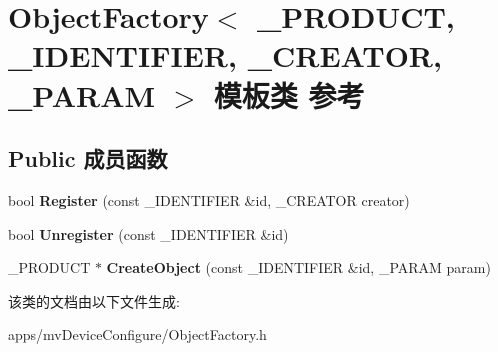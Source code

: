 \hypertarget{class_object_factory}{\section{Object\+Factory$<$ \+\_\+\+P\+R\+O\+D\+U\+C\+T, \+\_\+\+I\+D\+E\+N\+T\+I\+F\+I\+E\+R, \+\_\+\+C\+R\+E\+A\+T\+O\+R, \+\_\+\+P\+A\+R\+A\+M $>$ 模板类 参考}
\label{class_object_factory}
}
\subsection*{Public 成员函数}
\begin{DoxyCompactItemize}
\item 
\hypertarget{class_object_factory_af7f300f315c93d8d1061777167a89757}{bool {\bfseries Register} (const \+\_\+\+I\+D\+E\+N\+T\+I\+F\+I\+E\+R \&id, \+\_\+\+C\+R\+E\+A\+T\+O\+R creator)}\label{class_object_factory_af7f300f315c93d8d1061777167a89757}

\item 
\hypertarget{class_object_factory_a3758be797c33984e5d66e8d1408942cd}{bool {\bfseries Unregister} (const \+\_\+\+I\+D\+E\+N\+T\+I\+F\+I\+E\+R \&id)}\label{class_object_factory_a3758be797c33984e5d66e8d1408942cd}

\item 
\hypertarget{class_object_factory_a2800af9c7f02f2b63e8c8ce7354bf969}{\+\_\+\+P\+R\+O\+D\+U\+C\+T $\ast$ {\bfseries Create\+Object} (const \+\_\+\+I\+D\+E\+N\+T\+I\+F\+I\+E\+R \&id, \+\_\+\+P\+A\+R\+A\+M param)}\label{class_object_factory_a2800af9c7f02f2b63e8c8ce7354bf969}

\end{DoxyCompactItemize}


该类的文档由以下文件生成\+:\begin{DoxyCompactItemize}
\item 
apps/mv\+Device\+Configure/Object\+Factory.\+h\end{DoxyCompactItemize}
